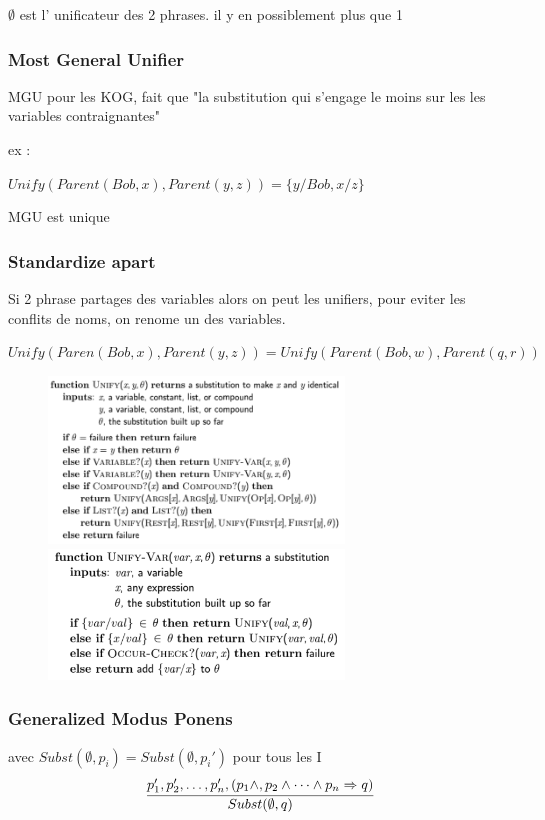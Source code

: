 		$\emptyset$ est l' unificateur des 2 phrases. il y en possiblement plus que 1
		
		\subsubsection{Most General Unifier}
			MGU pour les KOG, fait que "la substitution qui s'engage le moins sur les les variables contraignantes"
			
			ex : 
			
			$Unify(Parent(Bob,x),Parent(y,z)) = \{y/Bob, x/z\}$
			
			MGU est unique
			
		
		\subsubsection{Standardize apart}
			Si 2 phrase partages des variables alors on peut les unifiers, pour eviter les conflits de noms, on renome un des variables.
			
			$Unify(Paren(Bob,x), Parent(y,z)) = Unify(Parent(Bob,w), Parent(q,r))$
		
			\begin{figure}[htp]	
				\centering
				\includegraphics[width=0.7\textwidth]{img/Unification.png}
				\includegraphics[width=0.7\textwidth]{img/Unification1.png}
			\end{figure}
			
		\subsubsection{Generalized Modus Ponens}
			avec $Subst(\emptyset, p_i) = Subst(\emptyset,p_i')$ pour tous les I
			\begin{equation}
				\cfrac{p_1', p_2',\dots,p_n',(p_1 \land,p_2 \land \dots \land p_n \Rightarrow q)}{Subst(\emptyset, q)}
			\end{equation}
			
